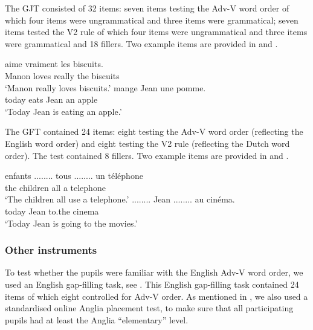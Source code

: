 \documentclass[output=paper]{langsci/langscibook}
\begin{document}
The GJT consisted of 32 items: seven items testing the Adv-V word order of which four items were ungrammatical and three items were grammatical; seven items tested the V2 rule of which four items were ungrammatical and three items were grammatical and 18 fillers. Two example items are provided in  and .

  \settowidth{}
  \ea%
  \label{ex:stadt:2}
   {aime} {vraiment} {les} {biscuits.}\\
  		Manon loves really     the biscuits\\
  \glt ‘Manon really loves biscuits.’
  \ex %
  \label{ex:stadt:3}
   {mange} {Jean} {une} {pomme.}\\
		  today eats Jean an apple\\
  \glt ‘Today Jean is eating an apple.’
  \z



The GFT contained 24 items: eight testing the Adv-V word order (reflecting the English word order) and eight testing the V2 rule (reflecting the Dutch word order). The test contained 8 fillers. Two example items are provided in  and .


  \ea%
  \label{ex:stadt:4}
   {enfants} {........} tous {........} un téléphone\\
  	the children {}             all {}           a telephone\\
  \glt ‘The children all use a telephone.’
  \ex %
  \label{ex:stadt:5}
   {........} {Jean} {........} {au} {cinéma.}\\
 		 today {}          Jean {}           to.the cinema\\
  \glt ‘Today Jean is going to the movies.’
  \z


\subsubsection{Other instruments}
\label{sec:stadt:3.3.2}

To test whether the pupils were familiar with the English Adv-V word order, we used an English gap-filling task, see . This English gap-filling task contained 24 items of which eight controlled for Adv-V order. As mentioned in , we also used a standardised online Anglia placement test, to make sure that all participating pupils had at least the Anglia ``elementary'' level.
\end{document}
